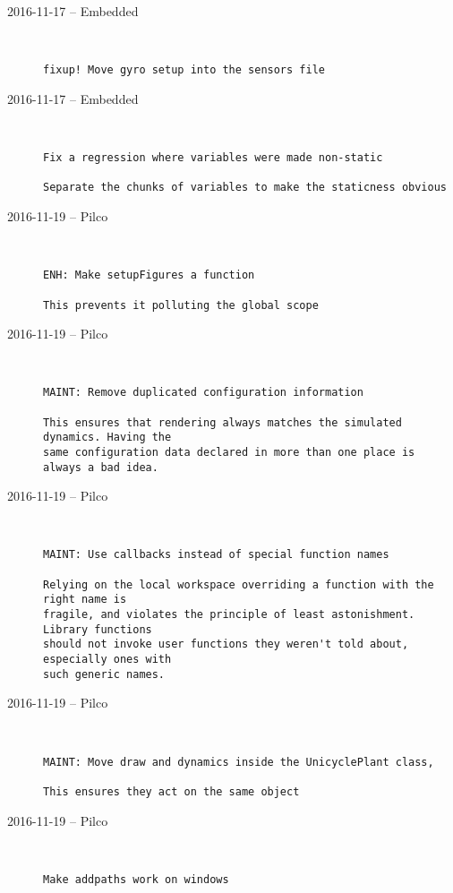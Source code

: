 \begin{description}
  \item[2016-11-17 -- Embedded] \hfill \
\begin{lstlisting}
fixup! Move gyro setup into the sensors file
\end{lstlisting}


  \item[2016-11-17 -- Embedded] \hfill \
\begin{lstlisting}
Fix a regression where variables were made non-static

Separate the chunks of variables to make the staticness obvious
\end{lstlisting}


  \item[2016-11-19 -- Pilco] \hfill \
\begin{lstlisting}
ENH: Make setupFigures a function

This prevents it polluting the global scope
\end{lstlisting}


  \item[2016-11-19 -- Pilco] \hfill \
\begin{lstlisting}
MAINT: Remove duplicated configuration information

This ensures that rendering always matches the simulated dynamics. Having the
same configuration data declared in more than one place is always a bad idea.
\end{lstlisting}


  \item[2016-11-19 -- Pilco] \hfill \
\begin{lstlisting}
MAINT: Use callbacks instead of special function names

Relying on the local workspace overriding a function with the right name is
fragile, and violates the principle of least astonishment. Library functions
should not invoke user functions they weren't told about, especially ones with
such generic names.
\end{lstlisting}


  \item[2016-11-19 -- Pilco] \hfill \
\begin{lstlisting}
MAINT: Move draw and dynamics inside the UnicyclePlant class,

This ensures they act on the same object
\end{lstlisting}


  \item[2016-11-19 -- Pilco] \hfill \
\begin{lstlisting}
Make addpaths work on windows


\end{lstlisting}
\end{description}
